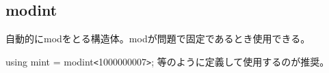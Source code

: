 \subsection{modint}

自動的にmodをとる構造体。modが問題で固定であるとき使用できる。

using mint = modint\verb|<|1000000007\verb|>|; 等のように定義して使用するのが推奨。

